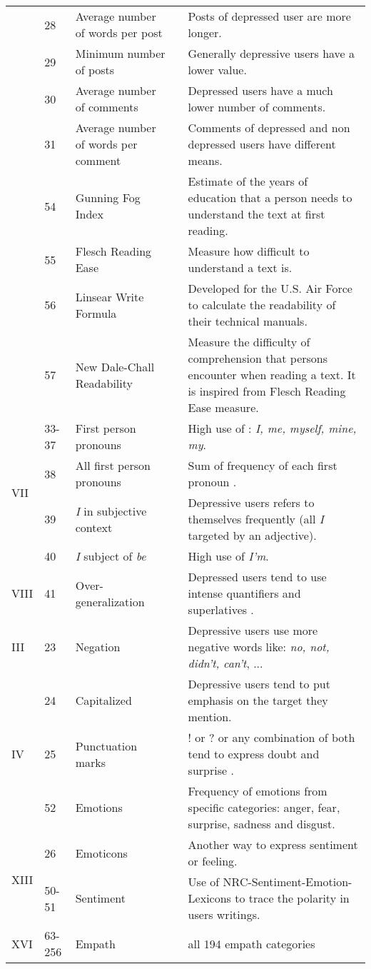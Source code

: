 \begin{longtable}{llp{3.5cm}p{0.3cm}p{6.5cm}}
& 28 & Average number of words per post&& Posts of depressed user are more longer.\\[3pt]
& 29 & Minimum number of posts && Generally depressive users have a lower value.\\[3pt]
& 30 & Average number of comments && Depressed users have a much lower number of comments.\\[3pt]
& 31 & Average number of words per comment && Comments of depressed and non depressed users have different means.\\[3pt]
\hline\pagebreak
\multirow{4}{*}{XV }
& 54 & Gunning Fog Index&& Estimate of the years of education that a person needs to understand the text at first reading.\\[3pt]
& 55 &Flesch Reading Ease&& Measure how difficult to understand a text is.\\[3pt]
& 56 &Linsear Write Formula&& Developed for the U.S. Air Force to calculate the readability of their technical manuals.\\[3pt]
& 57 &New Dale-Chall Readability && Measure the difficulty of comprehension that persons encounter when reading a text. It is inspired from Flesch Reading Ease measure.\\[3pt]
\hline
\multirow{4}{*}{VII} 
& 33-37 & First person pronouns&& High use of : \textit{I, me, myself, mine, my}.\\[3pt]
& 38 & All first person pronouns &&Sum of frequency of each first pronoun .\\[3pt]
& 39 & \textit{I} in subjective context && Depressive users refers to themselves frequently (all \textit{I} targeted by an adjective).\\[3pt]
& 40 &\textit{I} subject of \textit{be}&& High use of \textit{I'm}.\\[3pt]
\hline
VIII & 41 & Over-generalization  && Depressed users tend to use intense quantifiers and {superlatives} .\\[3pt]
\hline
III & 23 & Negation && Depressive users use more negative words like: \textit{no, not, didn’t, can't}, ... \\[3pt]
\hline
\multirow{3}{*}{IV}
& 24 & Capitalized & & Depressive users tend to put emphasis on the target they mention.\\[3pt]
& 25 & Punctuation marks & & ! or ? or any combination of both tend to express doubt and surprise .\\ [3pt]
& 52 & Emotions & & Frequency of emotions from specific categories: anger, fear, surprise, sadness and disgust.\\[3pt]
\hline
\multirow{2}{*}{XIII}
& 26 & Emoticons && Another way to express sentiment or feeling.\\[3pt]
& 50-51 & Sentiment & & Use of NRC-Sentiment-Emotion-Lexicons to trace the polarity in users writings.\\[3pt]
\hline
XVI & 63-256 & Empath & & all 194 empath categories\\ \hline
\end{longtable}